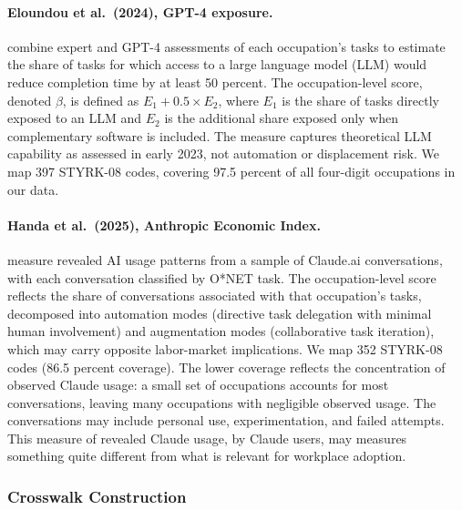 \documentclass[12pt]{article}
\begin{document}
\paragraph{Eloundou et al.\ (2024), GPT-4 exposure.} \citet{eloundou2024} combine expert and GPT-4 assessments of each occupation's tasks to estimate the share of tasks for which access to a large language model (LLM) would reduce completion time by at least 50 percent. The occupation-level score, denoted $\beta$, is defined as $E_1 + 0.5 \times E_2$, where $E_1$ is the share of tasks directly exposed to an LLM and $E_2$ is the additional share exposed only when complementary software is included. The measure captures theoretical LLM capability as assessed in early 2023, not automation or displacement risk. We map 397 STYRK-08 codes, covering 97.5 percent of all four-digit occupations in our data.

\paragraph{Handa et al.\ (2025), Anthropic Economic Index.} \citet{handa2025} measure revealed AI usage patterns from a sample of Claude.ai conversations, with each conversation classified by O*NET task. The occupation-level score reflects the share of conversations associated with that occupation's tasks, decomposed into automation modes (directive task delegation with minimal human involvement) and augmentation modes (collaborative task iteration), which may carry opposite labor-market implications. We map 352 STYRK-08 codes (86.5 percent coverage). The lower coverage reflects the concentration of observed Claude usage: a small set of occupations accounts for most conversations, leaving many occupations with negligible observed usage. The conversations may include personal use, experimentation, and failed attempts. This measure of revealed Claude usage, by Claude users, may measures something quite different from what is relevant for workplace adoption.

\subsubsection*{Crosswalk Construction}
\end{document}
